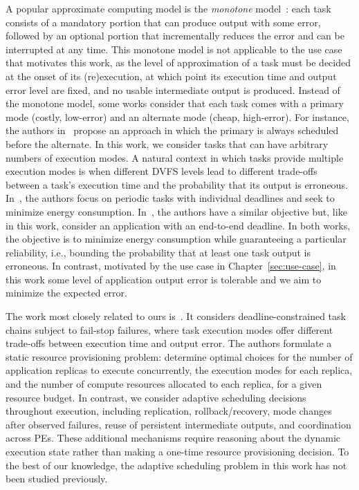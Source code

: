 A popular approximate computing model is the \emph{monotone}
model~\cite{259428}: each task consists of a mandatory portion that can
produce output with some error, followed by an optional portion that
incrementally reduces the error and can be interrupted at any time.  This
monotone model is not applicable to the use case that motivates this work,
as the level of approximation of a task must be decided at the onset of its
(re)execution, at which point its execution time and output error level are
fixed, and no usable intermediate output is produced.  Instead of the
monotone model, some works consider that each task comes with a primary
mode (costly, low-error) and an alternate mode (cheap, high-error).  For
instance, the authors in~\cite{10.1109/TC.2003.1183950} propose an approach
in which the primary is always scheduled before the alternate.  In this
work, we consider tasks that can have arbitrary numbers of execution modes.
A natural context in which tasks provide multiple execution modes is when
different DVFS levels lead to different trade-offs between a task's
execution time and the probability that its output is erroneous.
In~\cite{10.1145/2442087.2442094}, the authors focus on periodic tasks with
individual deadlines and seek to minimize energy consumption.
In~\cite{10.1007/s11227-021-03764-x}, the authors have a similar objective
but, like in this work, consider an application with an end-to-end
deadline. In both works, the objective is to minimize energy
consumption while guaranteeing a particular reliability, i.e., bounding the
probability that at least one task output is erroneous.  In contrast,
motivated by the use case in Chapter~\ref{sec:use-case}, in this work some
level of application output error is tolerable and we aim to minimize the
expected error.


The work most closely related to ours is~\cite{10678736}. It considers
deadline-constrained task chains subject to fail-stop failures, where task
execution modes offer different trade-offs between execution time and
output error.  The authors formulate a static resource provisioning
problem: determine optimal choices for the number of application replicas
to execute concurrently, the execution modes for each replica, and the
number of compute resources allocated to each replica, for a given resource
budget.  In contrast, we consider adaptive scheduling decisions throughout
execution, including replication, rollback/recovery, mode changes after
observed failures, reuse of persistent intermediate outputs, and
coordination across PEs. These additional mechanisms require reasoning
about the dynamic execution state rather than making a one-time resource
provisioning decision. To the best of our knowledge, the adaptive
scheduling problem in this work has not been studied previously.

